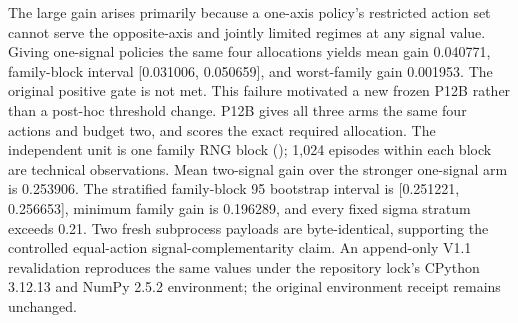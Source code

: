\markdownRendererInterblockSeparator
{}The large gain arises primarily because a one-axis policy's restricted action set cannot serve the opposite-axis and jointly limited regimes at any signal value.\markdownRendererInterblockSeparator
{}Giving one-signal policies the same four allocations yields mean gain 0.040771, family-block interval [0.031006, 0.050659], and worst-family gain 0.001953. The original positive gate is not met. This failure motivated a new frozen P12B rather than a post-hoc threshold change.\markdownRendererInterblockSeparator
{}
\markdownRendererSectionEnd \markdownRendererSectionBegin
{}\markdownRendererInterblockSeparator
{}P12B gives all three arms the same four actions and budget two, and scores the exact required allocation. The independent unit is one family RNG block (); 1,024 episodes within each block are technical observations. Mean two-signal gain over the stronger one-signal arm is 0.253906. The stratified family-block 95\markdownRendererPercentSign{} bootstrap interval is [0.251221, 0.256653], minimum family gain is 0.196289, and every fixed sigma stratum exceeds 0.21. Two fresh subprocess payloads are byte-identical, supporting the controlled equal-action signal-complementarity claim. An append-only V1.1 revalidation reproduces the same values under the repository lock's CPython 3.12.13 and NumPy 2.5.2 environment; the original environment receipt remains unchanged.
\markdownRendererSectionEnd 
\markdownRendererSectionEnd \markdownRendererDocumentEnd